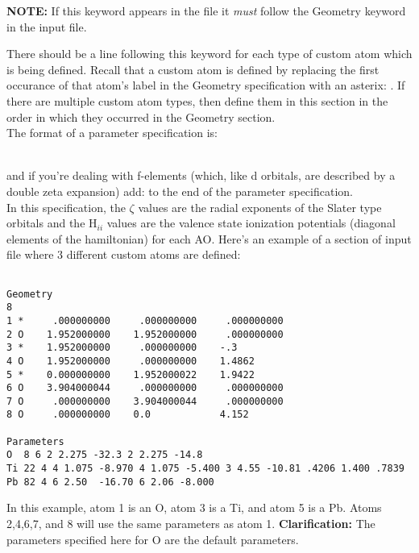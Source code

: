 {\bf NOTE:} If this keyword appears in the file it {\em must} follow
the {\sf Geometry} keyword in the input file.

There should be a line following this keyword for each type of custom
atom which is being defined.  Recall that a custom atom is defined by
replacing the first occurance of that atom's label in the Geometry
specification with an asterix: {\tt *}. If there are multiple custom
atom types, then define them in this section in the order in which
they occurred in the Geometry section. \\

\noindent The format of a parameter specification is:

{\small {} 
  
  
   
 } \\

\noindent and if you're dealing with f-elements (which, like d orbitals, are described by a double zeta expansion) add:
{\small {}   
 }
to the end of the parameter specification. \\

\noindent In this specification, the $\zeta$ values are the radial exponents of
the Slater type orbitals and the H$_{ii}$ values are the valence state
ionization potentials (diagonal elements of the hamiltonian) for each AO.
Here's an example of a section of input file where 3 different custom
atoms are defined:

\shrinkspacing
\begin{verbatim}

Geometry
8
1 *     .000000000     .000000000     .000000000
2 O    1.952000000    1.952000000     .000000000
3 *    1.952000000     .000000000    -.3
4 O    1.952000000     .000000000    1.4862
5 *    0.000000000    1.952000022    1.9422
6 O    3.904000044     .000000000     .000000000
7 O     .000000000    3.904000044     .000000000
8 O     .000000000    0.0   	     4.152

Parameters
O  8 6 2 2.275 -32.3 2 2.275 -14.8
Ti 22 4 4 1.075 -8.970 4 1.075 -5.400 3 4.55 -10.81 .4206 1.400 .7839
Pb 82 4 6 2.50  -16.70 6 2.06 -8.000

\end{verbatim}
\resumespacing
 
In this example, atom 1 is an O, atom 3 is a Ti, and atom 5 is a Pb.
Atoms 2,4,6,7, and 8 will use the same parameters as atom 1.  {\bf
Clarification:} The parameters specified here for O are the default
parameters. 


